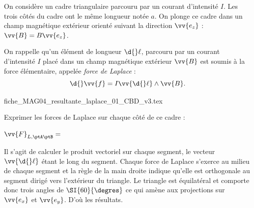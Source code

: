 On considère un cadre triangulaire parcouru par un courant 
d'intensité $I$.  Les trois côtés du cadre ont le même longueur notée $a$. On plonge ce cadre dans un champ magnétique
extérieur orienté suivant la direction $\vv{e_z}$ : $ \vv{B}=B\vv{e_{z}}$.

On rappelle qu'un élément de longueur $\d{}\ell$, parcouru par un courant d'intensité $I$ placé dans un champ magnétique extérieur $\vv{B}$ est soumis à la force élémentaire, appelée \emph{force de Laplace} : 
\[
\d{} \vv{f}=I\vv{\d{}\ell}\land\vv{B}.
\]


                                \initialisationPartieDroite %
\begin{center}
{fiche_MAG04_resultante_laplace_01_CBD_v3.tex}
\end{center}
                               \finalisationDuPartageDePage %



\smallskip

Exprimer les forces de Laplace sur chaque côté de ce cadre :

\smallskip


\debutEntrainement




\begin{enonce}
$\vv{F}_{L,\ptA\ptB}=$
\end{enonce}

\begin{corrige}
Il s'agit de calculer le produit vectoriel sur chaque segment, le vecteur $\vv{\d{}\ell}$ étant le long du segment. Chaque force de Laplace s'exerce au milieu de chaque segment et la règle de la main droite indique qu'elle est orthogonale au segment dirigé vers l'extérieur du triangle. Le triangle est équilatéral et comporte donc trois angles de $\SI{60}{\degres}$ ce qui amène aux projections sur $\vv{e_x}$ et $\vv{e_y}$. D'où les résultats.
\end{corrige}

